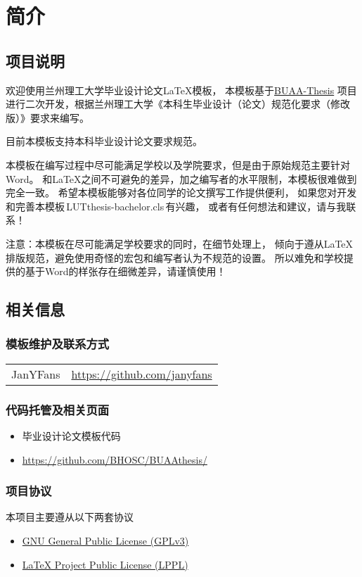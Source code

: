 \chapter{简介}

\section{项目说明}

	欢迎使用兰州理工大学毕业设计论文\LaTeX{}模板，
	本模板基于\href{https://github.com/BHOSC/BUAAthesis}{BUAA\hyp{}Thesis}
	项目进行二次开发，根据兰州理工大学《本科生毕业设计（论文）规范化要求（修改版）》要求来编写。
	
	目前本模板支持本科毕业设计论文要求规范。
	
	本模板在编写过程中尽可能满足学校以及学院要求，但是由于原始规范主要针对Word。
	和\LaTeX{}之间不可避免的差异，加之编写者的水平限制，本模板很难做到完全一致。
	希望本模板能够对各位同学的论文撰写工作提供便利，
	如果您对开发和完善本模板\,LUTthesis-bachelor.cls\,有兴趣，
	或者有任何想法和建议，请与我联系！
	
	{\heiti 注意：}本模板在尽可能满足学校要求的同时，在细节处理上，
	倾向于遵从\LaTeX{}排版规范，避免使用奇怪的宏包和编写者认为不规范的设置。
	所以难免和学校提供的基于Word的样张存在细微差异，请谨慎使用！

\section{相关信息}

\subsection{模板维护及联系方式}

	\begin{tabular}{ll}
		JanYFans & \url{https://github.com/janyfans}
	\end{tabular}

\subsection{代码托管及相关页面}

	\begin{itemize}
		\item 毕业设计论文模板代码
		\item[] \url{https://github.com/BHOSC/BUAAthesis/}
	\end{itemize}
	
\subsection{项目协议}
	本项目主要遵从以下两套协议
	\begin{itemize}
		\item \href{http://www.gnu.org/licenses/gpl.txt}
		{GNU General Public License (GPLv3)}
		\item \href{http://www.latex-project.org/lppl.txt}
		{\LaTeX{} Project Public License (LPPL)}
	\end{itemize}
	
